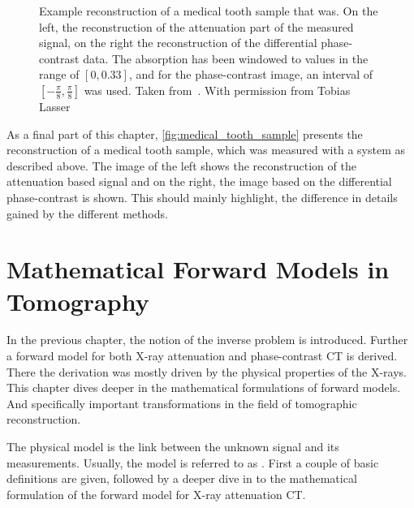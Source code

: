 \begin{figure}
	\centering
	\caption{Example reconstruction of a medical tooth sample that was. On the left, the
		reconstruction of the attenuation part of the measured signal, on the right the
		reconstruction of the differential phase-contrast data. The absorption has been
		windowed to values in the range of \([0, 0.33]\), and for the phase-contrast image,
		an interval of \([-\frac{\pi}{8}, \frac{\pi}{8}]\) was used. Taken
		from~\cite{wieczorek_anisotropic_2017}. With permission from Tobias Lasser}
	\label{fig:medical_tooth_sample}
\end{figure}

As a final part of this chapter, \autoref{fig:medical_tooth_sample} presents the reconstruction of a
medical tooth sample, which was measured with a system as described above. The image of the left
shows the reconstruction of the attenuation based signal and on the right, the image based on the
differential phase-contrast is shown. This should mainly highlight, the difference in details gained
by the different methods.

\chapter{Mathematical Forward Models in Tomography}\label{chap:radon_transform_and_related}

In the previous chapter, the notion of the inverse problem is introduced. Further a forward model
for both X-ray attenuation and phase-contrast CT is derived. There the derivation was mostly driven
by the physical properties of the X-rays. This chapter dives deeper in the mathematical formulations
of forward models. And specifically important transformations in the field of tomographic
reconstruction.

The physical model is the link between the unknown signal and its measurements. Usually, the model
is referred to as . First a couple of basic definitions are given, followed by a
deeper dive in to the mathematical formulation of the forward model for X-ray attenuation CT\@.

